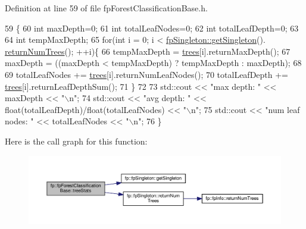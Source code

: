 Definition at line 59 of file fp\+Forest\+Classification\+Base.\+h.


\begin{DoxyCode}
59                             \{
60                 \textcolor{keywordtype}{int} maxDepth=0;
61                 \textcolor{keywordtype}{int} totalLeafNodes=0;
62                 \textcolor{keywordtype}{int} totalLeafDepth=0;
63 
64                 \textcolor{keywordtype}{int} tempMaxDepth;
65                 \textcolor{keywordflow}{for}(\textcolor{keywordtype}{int} i = 0; i < \hyperlink{classfp_1_1fpSingleton_a8bdae77b68521003e3fc630edec2e240}{fpSingleton::getSingleton}().
      \hyperlink{classfp_1_1fpSingleton_a8be36616345b6b77ce4c60b99cc2b91c}{returnNumTrees}(); ++i)\{
66                     tempMaxDepth = \hyperlink{classfp_1_1fpForestClassificationBase_a51482a6c95c4b3cb42627f029c2d4662}{trees}[i].returnMaxDepth();
67                     maxDepth = ((maxDepth < tempMaxDepth) ? tempMaxDepth : maxDepth);
68 
69                     totalLeafNodes += \hyperlink{classfp_1_1fpForestClassificationBase_a51482a6c95c4b3cb42627f029c2d4662}{trees}[i].returnNumLeafNodes();
70                     totalLeafDepth += \hyperlink{classfp_1_1fpForestClassificationBase_a51482a6c95c4b3cb42627f029c2d4662}{trees}[i].returnLeafDepthSum();
71                 \}
72 
73                 std::cout << \textcolor{stringliteral}{"max depth: "} << maxDepth << \textcolor{stringliteral}{"\(\backslash\)n"};
74                 std::cout << \textcolor{stringliteral}{"avg depth: "} << float(totalLeafDepth)/float(totalLeafNodes) << \textcolor{stringliteral}{"\(\backslash\)n"};
75                 std::cout << \textcolor{stringliteral}{"num leaf nodes: "} << totalLeafNodes << \textcolor{stringliteral}{"\(\backslash\)n"};
76             \}
\end{DoxyCode}
Here is the call graph for this function\+:\nopagebreak
\begin{figure}[H]
\begin{center}
\leavevmode
\includegraphics[width=350pt]{classfp_1_1fpForestClassificationBase_a48567d379434daeccb1540c84674d286_cgraph}
\end{center}
\end{figure}


